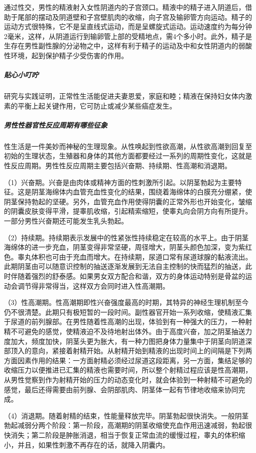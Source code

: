 \begin{enumerate}
通过性交，男性的精液射入女性阴道内的子宫颈口。精液中的精子进入阴道后，借助于尾部的摆动及阴道壁和子宫壁肌肉的收缩，向子宫及输卵管方向运动。精子的运动方式很特殊，它不是呈直线式运动，而是呈螺旋式运动。运动速度约为每分钟2毫米，这样，从阴道运行到输卵管上部的受精地点，需4个多小时。此外，精子是生存在男性副性腺的分泌物之中，这样有利于精子的运动及中和女性阴道内的弱酸性环境，起到保护精子少受伤害的作用。

\subparagraph{贴心小叮咛}

研究与实践证明，正常性生活能促进夫妻恩爱，家庭和睦；精液在保持妇女体内激素的平衡上起关键作用，它可防止或减少某些癌症发生。

\subparagraph{男性性器官性反应周期有哪些征象}

性生活是一件美妙而神秘的生理现象。从性唤起到性欲高潮，从性欲高潮到回复至初始的生理状态，生殖器和身体的其他方面都要经过一系列的周期性变化，这就是性反应周期。男性性反应周期主要包括兴奋期、持续期、性高潮和消退期。

（1）兴奋期。兴奋是由肉体或精神方面的性刺激所引起。以阴茎勃起为主要特征。这是阴茎海绵体内血管充血性变化的结果，围绕着海绵体的白膜充分绷紧，使阴茎保持勃起的坚硬。另外，血管充血作用使得阴囊的正常外形也开始变化，皱缩的阴囊皮肤变得平滑，提睾肌收缩，引起精索缩短，使睾丸向会阴方向有所提升。一部分男性兴奋期还可能发生乳头勃起。

（2）持续期。持续期表示发展中的性紧张性持续稳定在较高的水平上。由于阴茎海绵体的进一步充血，阴茎变得非常坚硬，周径增大，阴茎头颜色加深，变为紫红色。睾丸体积也可由于充血而增大。在持续期，尿道口常有尿道球腺的黏液流出。此期阴茎由可以随意识控制的抽送逐渐发展到无法自主控制的快而猛烈的抽送，此时伴随着强烈的舒泰感。如果男女双方配合和谐，双方的身体运动特别是骨盆的运动会调节得非常得当，这样双方会同时进入性高潮期。

（3）性高潮期。性高潮期即性兴奋强度最高的时期，其特异的神经生理机制至今仍不很清楚。此期只有极短暂的一段时间。副性器官开始一系列收缩，使精液汇集于尿道的前列腺部。在男性随着性高潮的出现，体验到有一种强大的压力，一种射精不可避免的感觉，使精液迫不及待地射出体外。由于高度兴奋，加之阴茎抽送力度加大，频度加快，阴茎头更为胀大，有一种力图把身体力量集中于阴茎向阴道深部顶入的意向，紧接着射精开始。从射精开始到精液的出现时间上的间隔是下列两方面因素作用的结果：一方面射精必须经过尿道这段距离，另一方面，集结足够的收缩压力以便推进已汇集的精液也需要时间，所以整个射精过程应该是性高潮期，从男性觉察到作为射精开始的压力的动态变化时，就会体验到一种射精不可避免的感觉，最后还得需要由前列腺、会阴部肌肉、阴茎体一起有节律地收缩来协同完成。

（4）消退期。随着射精的结束，性能量释放完毕。阴茎勃起很快消失。一般阴茎勃起减弱分两个阶段：第一阶段，高潮期的阴茎收缩使充血作用迅速减弱，勃起很快消失；第二阶段是肿胀消退，相当于恢复正常血流的缓慢过程，睾丸的体积缩小，并且，如果性刺激不再存在的话，就降入阴囊内。


\end{enumerate}
